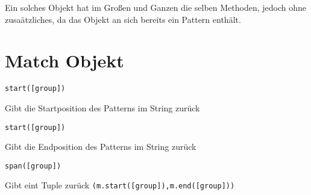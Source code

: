 \documentclass[ignorenonframetext,]{beamer}
\begin{document}
\begin{frame}

Ein solches Objekt hat im Großen und Ganzen die selben Methoden, jedoch
ohne zusaätzliches, da das Objekt an sich bereits ein Pattern enthält.

\end{frame}

\section{Match Objekt}\label{match-objekt}

\begin{frame}[fragile]

\begin{verbatim}
start([group])
\end{verbatim}

Gibt die Startposition des Patterns im String zurück

\begin{verbatim}
start([group])
\end{verbatim}

Gibt die Endposition des Patterns im String zurück

\begin{verbatim}
span([group])
\end{verbatim}

Gibt eint Tuple zurück
\texttt{(m.start({[}group{]}),m.end({[}group{]}))}

\end{frame}
\end{document}
